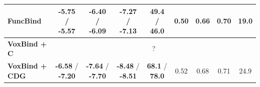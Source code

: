 \begin{table}[!t]
{\begin{tabular}{@{}lcccccccc@{}}
            FuncBind & -5.75 / -5.57 & -6.40 / -6.09 & -7.27 / -7.13 & 49.4 / 46.0 & 0.50 & 0.66 & 0.70 & 19.0 \\
            \midrule
            \textbf{VoxBind + C} & \multicolumn{8}{c}{?} \\
            \textbf{VoxBind + CDG} & \textbf{-6.58} / \textbf{-7.20} & \textbf{-7.64} / \textbf{-7.70} & \textbf{-8.48} / \textbf{-8.51} & \textbf{68.1} / \textbf{78.0} & 0.52 & 0.68 & 0.71 & 24.9 \\
            \bottomrule
        \end{tabular}
    }
\end{table}
